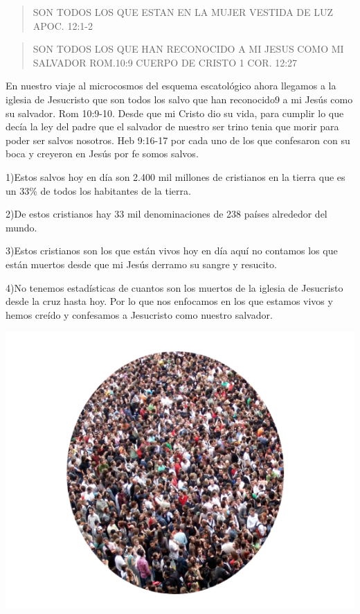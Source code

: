 \documentclass[]{book}
\begin{document}
\begin{quote}
SON TODOS LOS QUE ESTAN EN LA MUJER VESTIDA DE LUZ APOC. 12:1-2
\end{quote}

\begin{quote}
SON TODOS LOS QUE HAN RECONOCIDO A MI JESUS COMO MI SALVADOR ROM.10:9 CUERPO DE CRISTO 1 COR. 12:27
\end{quote}

En nuestro viaje al microcosmos del esquema escatológico ahora llegamos a la iglesia de Jesucristo que son todos los salvo que han reconocido9 a mi Jesús como su salvador. Rom 10:9-10. Desde que mi Cristo dio su vida, para cumplir lo que decía la ley del padre que el salvador de nuestro ser trino tenia que morir para poder ser salvos nosotros. Heb 9:16-17 por cada uno de los que confesaron con su boca y creyeron en Jesús por fe somos salvos.

1)Estos salvos hoy en día son 2.400 mil millones de cristianos en la tierra que es un 33\% de todos los habitantes de la tierra.

2)De estos cristianos hay 33 mil denominaciones de 238 países alrededor del mundo.

3)Estos cristianos son los que están vivos hoy en día aquí no contamos los que están muertos desde que mi Jesús derramo su sangre y resucito.

4)No tenemos estadísticas de cuantos son los muertos de la iglesia de Jesucristo desde la cruz hasta hoy. Por lo que nos enfocamos en los que estamos vivos y hemos creído y confesamos a Jesucristo como nuestro salvador.

\includegraphics{static/salvos_de_la_iglesia_de_cristo.png}
\end{document}
